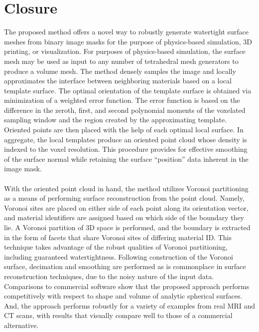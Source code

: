 \section{Closure}

The proposed method offers a novel way to robustly generate watertight surface meshes from binary image masks for the purpose of physics-based simulation, 3D printing, or visualization. For purposes of physics-based simulation, the surface mesh may be used as input to any number of tetrahedral mesh generators to produce a volume mesh. The method densely samples the image and locally approximates the interface between neighboring materials based on a local template surface. The optimal orientation of the template surface is obtained via minimization of a weighted error function. The error function is based on the difference in the zeroth, first, and second polynomial moments of the voxelated sampling window and the region created by the approximating template. Oriented points are then placed with the help of each optimal local surface. In aggregate, the local templates produce an oriented point cloud whose density is indexed to the voxel resolution. This procedure provides for effective smoothing of the surface normal while retaining the surface ``position'' data inherent in the image mask. \\ \\
%
With the oriented point cloud in hand, the method utilizes Voronoi partitioning as a means of performing surface reconstruction from the point cloud. Namely, Voronoi sites are placed on either side of each point along its orientation vector, and material identifiers are assigned based on which side of the boundary they lie. A Voronoi partition of 3D space is performed, and the boundary is extracted in the form of facets that share Voronoi sites of differing material ID. This technique takes advantage of the robust qualities of Voronoi partitioning, including guaranteed watertightness. Following construction of the Voronoi surface, decimation and smoothing are performed as is commonplace in surface reconstruction techniques, due to the noisy nature of the input data. Comparisons to commercial software show that the proposed approach performs competitively with respect to shape and volume of analytic spherical surfaces. And, the approach performs robustly for a variety of examples from real MRI and CT scans, with results that visually compare well to those of a commercial alternative. \\ \\
